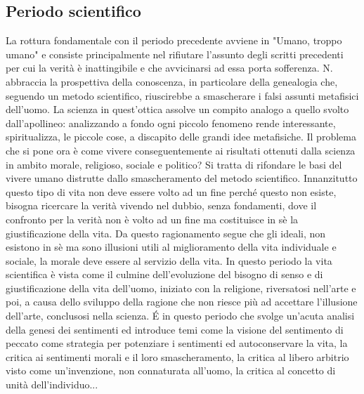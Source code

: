 \documentclass[10pt,a4paper]{article}
\begin{document}
\subsection{Periodo scientifico}
La rottura fondamentale con il periodo precedente avviene in "Umano, troppo umano" e consiste principalmente nel rifiutare l'assunto degli scritti precedenti per cui la verità è inattingibile e che avvicinarsi ad essa porta sofferenza. N. abbraccia la prospettiva della conoscenza, in particolare della genealogia che, seguendo un metodo scientifico, riuscirebbe a smascherare i falsi assunti metafisici dell'uomo. La scienza in quest'ottica assolve un compito analogo a quello svolto dall'apollineo: analizzando a fondo ogni piccolo fenomeno rende interessante, spiritualizza, le piccole cose, a discapito delle grandi idee metafisiche. Il problema che si pone ora è come vivere conseguentemente ai risultati ottenuti dalla scienza in ambito morale, religioso, sociale e politico? Si tratta di rifondare le basi del vivere umano distrutte dallo smascheramento del metodo scientifico. Innanzitutto questo tipo di vita non deve essere volto ad un fine perché questo non esiste, bisogna ricercare la verità vivendo nel dubbio, senza fondamenti, dove il confronto per la verità non è volto ad un fine ma costituisce in sè la giustificazione della vita.  Da questo ragionamento segue che gli ideali, non esistono in sè ma sono illusioni utili al miglioramento della vita individuale e sociale, la morale deve essere al servizio della vita. In questo periodo la vita scientifica è vista come il culmine dell'evoluzione del bisogno di senso e di giustificazione della vita dell'uomo, iniziato con la religione, riversatosi nell'arte e poi, a causa dello sviluppo della ragione che non riesce più ad accettare l'illusione dell'arte, conclusosi nella scienza. \'E in questo periodo che svolge un'acuta analisi della genesi dei sentimenti ed introduce temi come la visione del sentimento di peccato come strategia per potenziare i sentimenti ed autoconservare la vita, la critica ai sentimenti morali e il loro smascheramento, la critica al libero arbitrio visto come un'invenzione, non connaturata all'uomo, la critica al concetto di unità dell'individuo...
\end{document}
